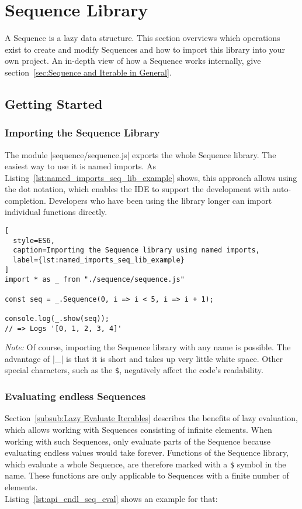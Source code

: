 \section{Sequence Library} %
\label{sec:Sequence Library}
A Sequence is a lazy data structure. This section overviews which operations
exist to create and modify Sequences and how to import this library into your
own project. An in-depth view of how a Sequence works
internally, give section~\ref{sec:Sequence and Iterable in General}.

\subsection{Getting Started} %
\label{sub:Getting Started}
\subsubsection{Importing the Sequence Library} %
\label{subsub:Importing the Sequence Library}

The module |sequence/sequence.js| exports the whole Sequence library. The
easiest way to use it is named imports. As
Listing~\ref{lst:named_imports_seq_lib_example} shows, this approach allows
using the dot notation, which enables the IDE to support the development with
auto-completion. Developers who have been using the library longer can import
individual functions directly.
\begin{lstlisting}[
  style=ES6,
  caption=Importing the Sequence library using named imports,
  label={lst:named_imports_seq_lib_example}
]
import * as _ from "./sequence/sequence.js"

const seq = _.Sequence(0, i => i < 5, i => i + 1);

console.log(_.show(seq));
// => Logs '[0, 1, 2, 3, 4]'
\end{lstlisting}
\textit{Note:} Of course, importing the Sequence library with any name is
possible. The advantage of |_| is that it is short and takes up very little
white space. Other special characters, such as the \lstinline{$}, negatively
affect the code's readability. 

\subsubsection{Evaluating endless Sequences} %
\label{subsub:Evaluating endless Sequences}
Section~\ref{subsub:Lazy Evaluate Iterables} describes the benefits of lazy
evaluation, which allows working with Sequences consisting of infinite
elements. When working with such Sequences, only evaluate parts of the Sequence
because evaluating endless values would take forever. Functions of the Sequence
library, which evaluate a whole Sequence, are therefore marked with a
\lstinline{$} symbol in the name. These functions are only applicable to
Sequences with a finite number of elements. \\
Listing~\ref{lst:api_endl_seq_eval} shows an example for that:

